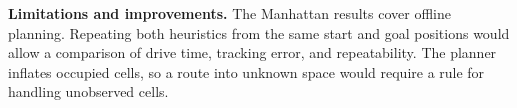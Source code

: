 \documentclass[11pt,twoside,letterpaper]{article}
\newcommand{\para}[1]{\textbf{#1}\quad}
\begin{document}
\para{Limitations and improvements.} The Manhattan results cover offline planning. Repeating both heuristics from the same start and goal positions would allow a comparison of drive time, tracking error, and repeatability. The planner inflates occupied cells, so a route into unknown space would require a rule for handling unobserved cells.
\end{document}
